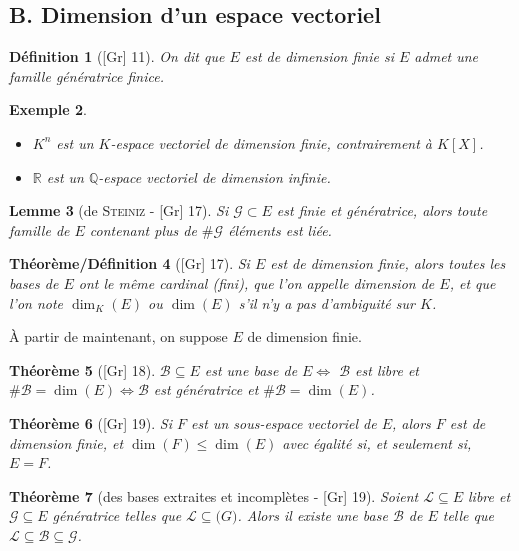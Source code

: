 \documentclass[10pt, a4paper, parskip=full, twoside, twocolumn]{report}
\newtheorem{definition}{Définition}
\newtheorem{theorem}[definition]{Théorème}
\newtheorem{theorem_def}[definition]{Théorème/Définition}
\newtheorem{lemma}[definition]{Lemme}
\newtheorem{example}[definition]{Exemple}
\newcommand{\IQ}{\mathbb{Q}}
\newcommand{\IR}{\mathbb{R}}
\begin{document}
\subsection*{B. Dimension d'un espace vectoriel}
\begin{definition}[\textnormal{[Gr] 11}]
	On dit que $E$ est de \emph{dimension finie} si $E$ admet une famille génératrice finice.
\end{definition}

\begin{example}
	\begin{itemize}
		\item $K^n$ est un $K$-espace vectoriel de dimension finie, contrairement à $K[X]$.
		\item $\IR$ est un $\IQ$-espace vectoriel de dimension infinie.
	\end{itemize}
\end{example}

\begin{lemma}[de \textsc{Steiniz} - \textnormal{[Gr] 17}]
	Si $\mathcal{G}\subset E$ est finie et génératrice, alors toute
	famille de $E$ contenant plus de $\#\mathcal{G}$ éléments est liée.
\end{lemma}

\begin{theorem_def}[\textnormal{[Gr] 17}]
	Si $E$ est de dimension finie, alors toutes les bases de $E$ ont le même cardinal (fini),
	que l'on appelle \emph{dimension de $E$}, et que l'on note 
	$\dim_K(E)$ ou $\dim(E)$ s'il n'y a pas d'ambiguité sur $K$.
\end{theorem_def}

\textcolor{paragraphtext}{À partir de maintenant, on suppose $E$ de dimension finie.}

\begin{theorem}[\textnormal{[Gr] 18}]
	$\mathcal{B}\subseteq E$ est une base de $E \iff$ $\mathcal{B}$ est 
	libre et $\#\mathcal{B}= \dim(E)\iff \mathcal{B}$ est génératrice et $\#\mathcal{B} = \dim(E)$.
\end{theorem}

\begin{theorem}[\textnormal{[Gr] 19}]
	Si $F$ est un sous-espace vectoriel de $E$, alors $F$ est de dimension finie, et 
	$\dim(F)\leq \dim(E)$ avec égalité si, et seulement si, $E= F$.
\end{theorem}

\begin{theorem}[des bases extraites et incomplètes - \textnormal{[Gr] 19}]
	Soient $\mathcal{L}\subseteq E$ libre et $\mathcal{G}\subseteq E$ génératrice 
	telles que $\mathcal{L}\subseteq \mathcal(G)$. Alors il existe une base $\mathcal{B}$ de 
	$E$ telle que $\mathcal{L}\subseteq \mathcal{B} \subseteq \mathcal{G}$.
\end{theorem}
\end{document}

